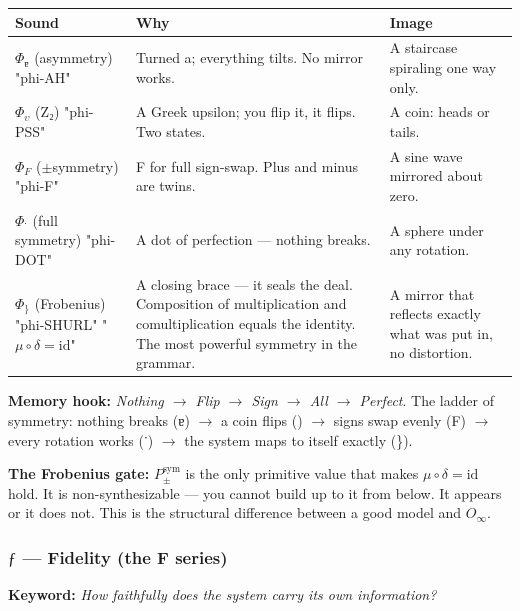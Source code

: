 \documentclass[12pt,a4paper]{article}
\begin{document}
\begin{table}[htbp]
\centering
\small
{}
\begin{tabularx}{\textwidth}{>{\centering\arraybackslash}X >{\centering\arraybackslash}X >{\centering\arraybackslash}X}
\toprule
\rowcolor{gray!25}\textbf{Sound} & \textbf{Why} & \textbf{Image} \\
\midrule
\rowcolors{1}{white}{gray!10}
\textbf{$\Phi_{\text{ɐ}}$} (asymmetry) "phi-AH" & Turned a; everything tilts. No mirror works. & A staircase spiraling one way only. \\
\textbf{$\Phi_{\upsilon}$} (Z₂) "phi-PSS" & A Greek upsilon; you flip it, it flips. Two states. & A coin: heads or tails. \\
\textbf{$\Phi_{F}$} ($\pm$symmetry) "phi-F" & F for full sign-swap. Plus and minus are twins. & A sine wave mirrored about zero. \\
\textbf{$\Phi_{\text{˙}}$} (full symmetry) "phi-DOT" & A dot of perfection --- nothing breaks. & A sphere under any rotation. \\
\textbf{$\Phi_{\}}$} (Frobenius) "phi-SHURL" "$\mu \circ \delta = \text{id}$" & A closing brace --- it seals the deal. Composition of multiplication and comultiplication equals the identity. The most powerful symmetry in the grammar. & A mirror that reflects exactly what was put in, no distortion. \\
\bottomrule
\end{tabularx}
\end{table}

\textbf{Memory hook:} \emph{Nothing $\rightarrow$ Flip $\rightarrow$ Sign $\rightarrow$ All $\rightarrow$ Perfect}. The ladder of symmetry: nothing breaks (ɐ) $\rightarrow$ a coin flips (\upsilon) $\rightarrow$ signs swap evenly (F) $\rightarrow$ every rotation works (˙) $\rightarrow$ the system maps to itself exactly (\}).

\textbf{The Frobenius gate:} $P_{\pm}^{\text{sym}}$ is the only primitive value that makes $\mu \circ \delta = \text{id}$ hold. It is non-synthesizable --- you cannot build up to it from below. It appears or it does not. This is the structural difference between a good model and $O_{\infty}$.

\subsubsection{$ƒ$ --- Fidelity (the \textbf{F} series)}

\textbf{Keyword:} \emph{How faithfully does the system carry its own information?}
\end{document}
